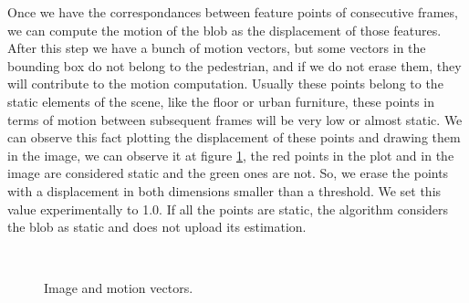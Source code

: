 
Once we have the correspondances between feature points of consecutive frames, we can compute the motion of the blob as the displacement of those features. After this step we have a bunch of motion vectors, but some vectors in the bounding box do not belong to the pedestrian, and if we do not erase them, they will contribute to the motion computation. Usually these points belong to the static elements of the scene, like the floor or urban furniture, these points in terms of motion between subsequent frames will be very low or almost static. We can observe this fact plotting the displacement of these points and drawing them in the image, we can observe it at figure \ref{motion2}, the red points in the plot and in the image are considered static and the green ones are not. So, we erase the points with a displacement in both dimensions smaller than a threshold. We set this value experimentally to 1.0. If all the points are static, the algorithm considers the blob as static and does not upload its estimation.  


\begin{figure}[H]
		
\centering

\\
\caption{Image and motion vectors.}
\label{motion2}
\end{figure}

